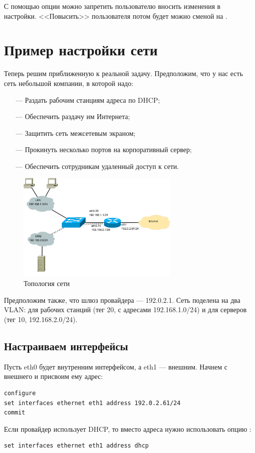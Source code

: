 \documentclass[a4paper,12pt, twoside, russian]{report}
\begin{document}
С помощью опции  можно запретить пользователю вносить изменения в настройки.
<<Повысить>> пользователя потом будет можно сменой  на .

\chapter{Пример настройки сети}
Теперь решим приближенную к реальной задачу. Предположим, что у нас есть сеть небольшой компании, в которой надо:
\begin{itemize}
 \item[---] Раздать рабочим станциям адреса по DHCP;
 \item[---] Обеспечить раздачу им Интернета;
 \item[---] Защитить сеть межсетевым экраном;
 \item[---] Прокинуть несколько портов на корпоративный сервер;
 \item[---] Обеспечить сотрудникам удаленный доступ к сети.
\end{itemize}

\begin{figure}[hc]
 \begin{center}
   \includegraphics[width=0.7\textwidth]{images/topology}
   \caption{Топология сети}
  \end{center}
\end{figure}

Предположим также, что шлюз провайдера --- 192.0.2.1. Сеть поделена на два VLAN:
для рабочих станций (тег 20, с адресами 192.168.1.0/24) и для серверов (тег 10, 192.168.2.0/24).

\section{Настраиваем интерфейсы}
Пусть eth0 будет внутренним интерфейсом, а eth1 --- внешним. Начнем с внешнего и присвоим ему адрес:
\begin{verbatim}
configure
set interfaces ethernet eth1 address 192.0.2.61/24
commit
\end{verbatim}
Если провайдер использует DHCP, то вместо адреса нужно использовать опцию :
\begin{verbatim}
set interfaces ethernet eth1 address dhcp
\end{verbatim}
\end{document}
